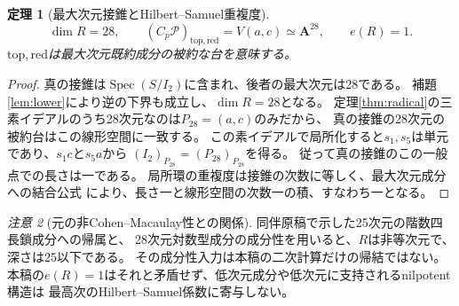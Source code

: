 \documentclass[a4paper,11pt]{ltjsarticle}
\newtheorem{theorem}{定理}[section]
\theoremstyle{remark}\newtheorem{remark}[theorem]{注意}
\newcommand{\Spec}{\operatorname{Spec}}\newcommand{\rank}{\operatorname{rank}}
\begin{document}
\begin{theorem}[最大次元接錐とHilbert--Samuel重複度]\label{thm:mult}
\[
 \dim R=28,\qquad (C_p\mathcal P)_{\mathrm{top,red}}=V(a,c)\simeq\mathbf A^{28},
 \qquad e(R)=1.
\]
$\mathrm{top,red}$は最大次元既約成分の被約な台を意味する。
\end{theorem}
\begin{proof}
真の接錐は$\Spec(S/I_2)$に含まれ、後者の最大次元は28である。
補題\ref{lem:lower}により逆の下界も成立し、$\dim R=28$となる。
定理\ref{thm:radical}の三素イデアルのうち28次元なのは$P_{28}=(a,c)$のみだから、
真の接錐の28次元の被約台はこの線形空間に一致する。
この素イデアルで局所化すると$s_1,s_5$は単元であり、$s_1c$と$s_5a$から
$(I_2)_{P_{28}}=(P_{28})_{P_{28}}$を得る。
従って真の接錐のこの一般点での長さは一である。
局所環の重複度は接錐の次数に等しく、最大次元成分への結合公式
\cite[Lemma 43.15.3]{StacksMult}により、長さ一と線形空間の次数一の積、すなわち一となる。
\end{proof}

\begin{remark}[元の非Cohen--Macaulay性との関係]
同伴原稿\cite{Incidence}で示した25次元の階数四長鎖成分への帰属と、
28次元対数型成分の成分性を用いると、$R$は非等次元で、深さは25以下である。
その成分性入力は本稿の二次計算だけの帰結ではない。
本稿の$e(R)=1$はそれと矛盾せず、低次元成分や低次元に支持されるnilpotent構造は
最高次のHilbert--Samuel係数に寄与しない。
\end{remark}
\end{document}
